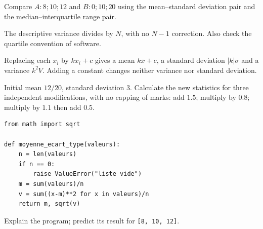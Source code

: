 \begin{example}Compare $A:8;10;12$ and $B:0;10;20$ using the mean--standard deviation pair and the median--interquartile range pair.\end{example}
\begin{teachernote}The descriptive variance divides by $N$, with no $N-1$ correction. Also check the quartile convention of software.\end{teachernote}
\begin{keypoint}[Property]
Replacing each $x_i$ by $kx_i+c$ gives a mean $k\overline x+c$, a standard deviation $|k|\sigma$ and a variance $k^2V$. Adding a constant changes neither variance nor standard deviation.
\end{keypoint}
\begin{example}Initial mean $12/20$, standard deviation $3$. Calculate the new statistics for three independent modifications, with no capping of marks: add $\num{1,5}$; multiply by $\num{0,8}$; multiply by $\num{1,1}$ then add $\num{0,5}$.\end{example}
\begin{lstlisting}
from math import sqrt

def moyenne_ecart_type(valeurs):
    n = len(valeurs)
    if n == 0:
        raise ValueError("liste vide")
    m = sum(valeurs)/n
    v = sum((x-m)**2 for x in valeurs)/n
    return m, sqrt(v)
\end{lstlisting}
\begin{example}Explain the program; predict its result for \texttt{[8, 10, 12]}.\end{example}

